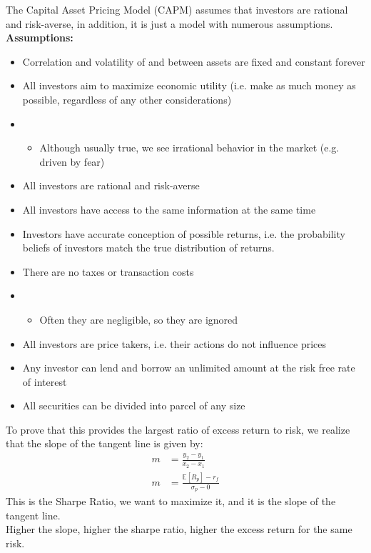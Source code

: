 \begin{theorem}
    The Capital Asset Pricing Model (CAPM) assumes that investors are rational and risk-averse, in addition, it is just a model with numerous assumptions.\\
    \textbf{Assumptions:}
    \begin{itemize}
        \item Correlation and volatility of and between assets are fixed and constant forever
        \item All investors aim to maximize economic utility (i.e. make as much money as possible, regardless of any other considerations)
        \item[] \begin{itemize}
                  \item Although usually true, we see irrational behavior in the market (e.g. driven by fear)
              \end{itemize}
        \item All investors are rational and risk-averse
        \item All investors have access to the same information at the same time
        \item Investors have accurate conception of possible returns, i.e. the probability beliefs of investors match the true distribution of returns.
        \item There are no taxes or transaction costs
        \item[] \begin{itemize}
                  \item Often they are negligible, so they are ignored
              \end{itemize}
        \item All investors are price takers, i.e. their actions do not influence prices
        \item Any investor can lend and borrow an unlimited amount at the risk free rate of interest
        \item All securities can be divided into parcel of any size
    \end{itemize}
\end{theorem}


\begin{definition}
    To prove that this provides the largest ratio of excess return to risk, we realize that the slope of the tangent line is given by:
    \begin{align*}
        m & = \frac{y_2 - y_1}{x_2 - x_1}                \\
        m & = \frac{\mathbb{E}[R_p] - r_f}{\sigma_p - 0}
    \end{align*}
    This is the Sharpe Ratio, we want to maximize it, and it is the slope of the tangent line.\\
    Higher the slope, higher the sharpe ratio, higher the excess return for the same risk.
\end{definition}



